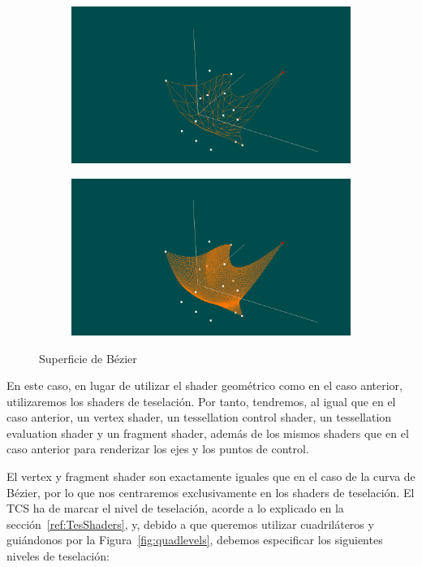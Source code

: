 \begin{figure}
	\centering		
	\begin{subfigure}{\textwidth}
		\includegraphics[width=\textwidth]{figures/mybeziersurface1.png}
	\end{subfigure}
	\newline
	\begin{subfigure}{\textwidth}
		\includegraphics[width=\textwidth]{figures/mybeziersurface2.png}
	\end{subfigure}
	\caption{Superficie de Bézier}
	\label{fig:mybeziersurface}
\end{figure}

En este caso, en lugar de utilizar el shader geométrico como en el caso
anterior, utilizaremos los shaders de teselación. Por tanto, tendremos, al igual
que en el caso anterior, un vertex shader, un tessellation control shader, un
tessellation evaluation shader y un fragment shader, además de los mismos
shaders que en el caso anterior para renderizar los ejes y los puntos de
control. 

El vertex y fragment shader son exactamente iguales que en el caso de la curva
de Bézier, por lo que nos centraremos exclusivamente en los shaders de
teselación. El TCS ha de marcar el nivel de teselación, acorde a lo explicado en
la sección~\ref{ref:TesShaders}, y, debido a que queremos utilizar cuadriláteros
y guiándonos por la Figura~\ref{fig:quadlevels}, debemos especificar los
siguientes niveles de teselación:

